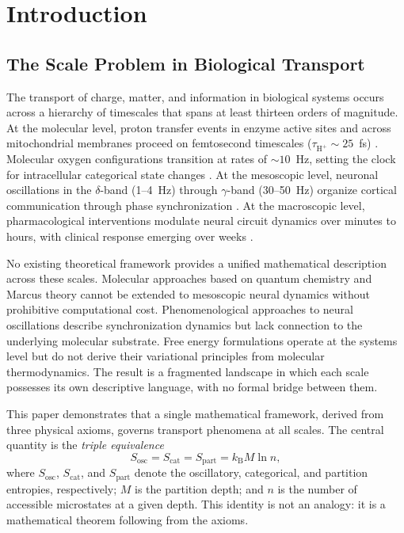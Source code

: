 \documentclass[twocolumn,10pt]{article}
\newcommand{\Sosc}{S_{\mathrm{osc}}}
\newcommand{\Scat}{S_{\mathrm{cat}}}
\newcommand{\Spart}{S_{\mathrm{part}}}
\newcommand{\kB}{k_{\mathrm{B}}}
\newcommand{\Hplus}{\mathrm{H}^{+}}
\begin{document}
\section{Introduction}
\label{sec:intro}

\subsection{The Scale Problem in Biological Transport}

The transport of charge, matter, and information in biological systems occurs across a hierarchy of timescales that spans at least thirteen orders of magnitude.  At the molecular level, proton transfer events in enzyme active sites and across mitochondrial membranes proceed on femtosecond timescales ($\tau_{\Hplus} \sim 25$~fs) \citep{marcus1993electron, klinman2013importance}.  Molecular oxygen configurations transition at rates of $\sim\!10$~Hz, setting the clock for intracellular categorical state changes \citep{herzberg1950spectra, huber1979molecular}.  At the mesoscopic level, neuronal oscillations in the $\delta$-band (1--4~Hz) through $\gamma$-band (30--50~Hz) organize cortical communication through phase synchronization \citep{buzsaki2004neuronal, buzsaki2006rhythms, fries2005mechanism}.  At the macroscopic level, pharmacological interventions modulate neural circuit dynamics over minutes to hours, with clinical response emerging over weeks \citep{cipriani2018comparative}.

No existing theoretical framework provides a unified mathematical description across these scales.  Molecular approaches based on quantum chemistry and Marcus theory \citep{marcus1993electron} cannot be extended to mesoscopic neural dynamics without prohibitive computational cost.  Phenomenological approaches to neural oscillations \citep{kuramoto1984chemical, strogatz2000kuramoto} describe synchronization dynamics but lack connection to the underlying molecular substrate.  Free energy formulations \citep{friston2010free} operate at the systems level but do not derive their variational principles from molecular thermodynamics.  The result is a fragmented landscape in which each scale possesses its own descriptive language, with no formal bridge between them.

This paper demonstrates that a single mathematical framework, derived from three physical axioms, governs transport phenomena at all scales.  The central quantity is the \emph{triple equivalence}
\begin{equation}
  \Sosc = \Scat = \Spart = \kB M \ln n,
  \label{eq:triple}
\end{equation}
where $\Sosc$, $\Scat$, and $\Spart$ denote the oscillatory, categorical, and partition entropies, respectively; $M$ is the partition depth; and $n$ is the number of accessible microstates at a given depth.  This identity is not an analogy: it is a mathematical theorem following from the axioms.
\end{document}

